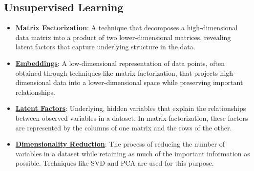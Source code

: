 \documentclass{article}%
\begin{document}
\subsection{Unsupervised Learning}%
\label{subsec:UnsupervisedLearning}%
\begin{itemize}[leftmargin=*]%
\item \href{https://purdue.brightspace.com/d2l/common/assets/pdfjs-d2l-dist/1.0.14-legacy/web/viewer.html?file=\%2Fcontent\%2Fenforced\%2F1095467-wl.202510.CS.24300.001\%2F11L2-svd-pca-recommender.pdf\%3Fou\%3D1095467\&lang=en-us\&container=d2l-fileviewer-rendered-pdf\&fullscreen=d2l-fileviewer-rendered-pdf-dialog\&height=667#page=2}{\textbf{Matrix Factorization}}: A technique that decomposes a high-dimensional data matrix into a product of two lower-dimensional matrices, revealing latent factors that capture underlying structure in the data.%
\item \href{https://purdue.brightspace.com/d2l/common/assets/pdfjs-d2l-dist/1.0.14-legacy/web/viewer.html?file=\%2Fcontent\%2Fenforced\%2F1095467-wl.202510.CS.24300.001\%2F11L2-svd-pca-recommender.pdf\%3Fou\%3D1095467\&lang=en-us\&container=d2l-fileviewer-rendered-pdf\&fullscreen=d2l-fileviewer-rendered-pdf-dialog\&height=667#page=5}{\textbf{Embeddings}}: A low-dimensional representation of data points, often obtained through techniques like matrix factorization, that projects high-dimensional data into a lower-dimensional space while preserving important relationships.%
\item \href{https://purdue.brightspace.com/d2l/common/assets/pdfjs-d2l-dist/1.0.14-legacy/web/viewer.html?file=\%2Fcontent\%2Fenforced\%2F1095467-wl.202510.CS.24300.001\%2F11L2-svd-pca-recommender.pdf\%3Fou\%3D1095467\&lang=en-us\&container=d2l-fileviewer-rendered-pdf\&fullscreen=d2l-fileviewer-rendered-pdf-dialog\&height=667#page=5}{\textbf{Latent Factors}}: Underlying, hidden variables that explain the relationships between observed variables in a dataset. In matrix factorization, these factors are represented by the columns of one matrix and the rows of the other.%
\item \href{https://purdue.brightspace.com/d2l/common/assets/pdfjs-d2l-dist/1.0.14-legacy/web/viewer.html?file=\%2Fcontent\%2Fenforced\%2F1095467-wl.202510.CS.24300.001\%2F11L2-svd-pca-recommender.pdf\%3Fou\%3D1095467\&lang=en-us\&container=d2l-fileviewer-rendered-pdf\&fullscreen=d2l-fileviewer-rendered-pdf-dialog\&height=667#page=8}{\textbf{Dimensionality Reduction}}: The process of reducing the number of variables in a dataset while retaining as much of the important information as possible. Techniques like SVD and PCA are used for this purpose.%

\end{itemize}
\end{document}
